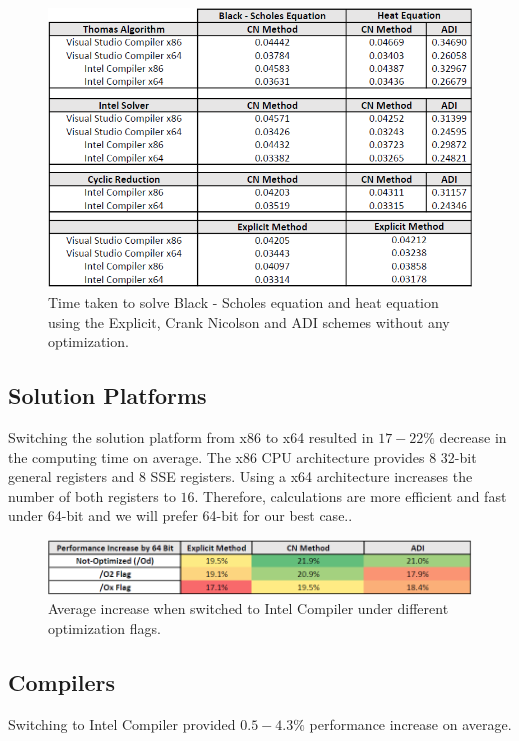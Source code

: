 \documentclass[12pt, oneside]{book}
\theoremstyle{plain}
\theoremstyle{definition}
\begin{document}
\begin{figure}[!htb]
    \centering
        \includegraphics[scale=0.6]{notOptimized.png}
    \caption{Time taken to solve Black - Scholes equation and heat equation using the Explicit, Crank Nicolson and ADI schemes  without any optimization.}
\end{figure}


\subsection{Solution Platforms} 
Switching the solution platform from x86 to x64 resulted in $17 - 22 \%$ decrease in the computing time on average.  The x86 CPU architecture provides $8$ 32-bit general registers and $8$ SSE registers. Using a x64 architecture increases the number of both registers  to $16$. Therefore, calculations are more efficient and fast under 64-bit and we will prefer 64-bit for our best case..

\begin{figure}[!htb]
    \centering
        \includegraphics[scale=0.7]{bitPercent.png}
    \caption{Average increase when switched to Intel Compiler under different optimization flags.}
    \label{bitPercent}
\end{figure}



\subsection{Compilers} 
Switching to Intel Compiler provided $0.5 - 4.3 \%$ performance increase on average. 
\end{document}
